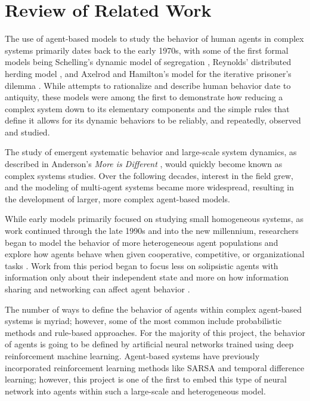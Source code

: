 \chapter{Review of Related Work}

The use of agent-based models to study the behavior of human agents in complex 
systems primarily dates back to the early 1970s, with some of the first formal 
models being Schelling's dynamic model of segregation
\cite{schelling1971dynamic}, 
Reynolds' distributed herding model \cite{reynolds1987flocks}, 
and Axelrod and Hamilton's model for the iterative prisoner's dilemma 
\cite{axelrod1981evolution}.
While attempts to rationalize and describe human behavior date to antiquity, 
these models were among the first to demonstrate how reducing a complex system 
down to its elementary components and the simple rules that define it allows 
for its dynamic behaviors to be reliably, and repeatedly, observed and studied.

The study of emergent systematic behavior and large-scale system dynamics, 
as described in Anderson's \emph{More is Different} \cite{anderson1972more}, 
would quickly become known as complex systems studies.
Over the following decades, interest in the field grew, and the modeling of 
multi-agent systems became more widespread, resulting in the development of 
larger, more complex agent-based models.

While early models primarily focused on studying small homogeneous systems, 
as work continued through the late 1990s and into the new millennium, 
researchers began to model the behavior of more heterogeneous agent 
populations \cite{socsci00} 
and explore how agents behave when given cooperative, competitive, or 
organizational tasks \cite{comcol97}. 
Work from this period began to focus less on solipsistic agents with 
information only about their independent state and more on how information 
sharing and networking can affect agent behavior \cite{prietula1998simulating}.

The number of ways to define the behavior of agents within complex agent-based 
systems is myriad; 
however, some of the most common include probabilistic methods and rule-based 
approaches. 
For the majority of this project, the behavior of agents is going to be 
defined by artificial neural networks trained using deep reinforcement 
machine learning. 
Agent-based systems have previously incorporated reinforcement learning methods 
like SARSA and temporal difference learning; however, this project is one of the first to embed this type of neural network into agents within such a large-scale and heterogeneous model.

